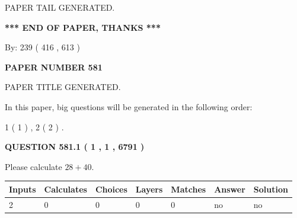 \documentclass[12pt]{article}
\begin{document}
   
   
\vspace{2.0in} PAPER TAIL GENERATED.
   
   
   
   
\vspace{1.0in} 
{\textbf{\large{ *** END OF PAPER, THANKS *** }}} 
   
   
\hspace{1.0in} By: 
 239 ( 416 ,  613 )
   
   
   
   
\newpage 
\setcounter{page}{ 
   581001 } 
   
   
   
   
 {\textbf{ \Large{ PAPER NUMBER  581  }}}
   
   
\vspace{0.2in}
   
   
   
   
   
   
   
   
 \vspace{0.2in}
 
 
 
 
   
   
 PAPER TITLE GENERATED.
   
   
   
\vspace{0.2in}
   
In this paper, big questions will be generated in the following order: 
   
   
   1 ( 1 )
 ,
   2 ( 2 )
 .
  
\vspace{0.2in}
  
{\textbf{\Large{QUESTION
581.1 
 ( 1 , 1 , 6791 )
}}}
  
  
 
Please calculate $ %
28 +  %
40 $.
 
 
   
   
   
   
\noindent\begin{tabular}{|l|l|l|l|l|l|l|}
 \hline
Inputs & Calculates & Choices & Layers & Matches & Answer & Solution \\ \hline
 2  & 
 0  & 
 0
  & 
 0  & 
 0  & 
  no & 
  no 
  \\ \hline
 \end{tabular}
   
\end{document}
